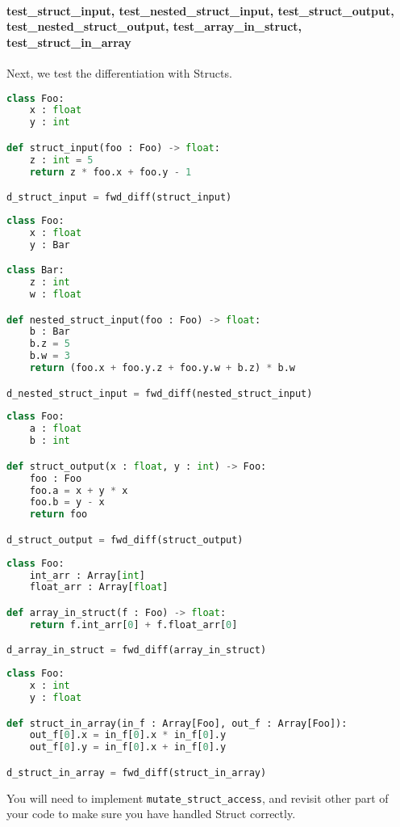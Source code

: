 \paragraph{test_struct_input, test_nested_struct_input, test_struct_output, test_nested_struct_output, test_array_in_struct, test_struct_in_array} Next, we test the differentiation with Structs.
\begin{lstlisting}[language=Python]
class Foo:
    x : float
    y : int

def struct_input(foo : Foo) -> float:
    z : int = 5
    return z * foo.x + foo.y - 1

d_struct_input = fwd_diff(struct_input)
\end{lstlisting}
\begin{lstlisting}[language=Python]
class Foo:
    x : float
    y : Bar

class Bar:
    z : int
    w : float

def nested_struct_input(foo : Foo) -> float:
    b : Bar
    b.z = 5
    b.w = 3
    return (foo.x + foo.y.z + foo.y.w + b.z) * b.w

d_nested_struct_input = fwd_diff(nested_struct_input)
\end{lstlisting}
\begin{lstlisting}[language=Python]
class Foo:
    a : float
    b : int

def struct_output(x : float, y : int) -> Foo:
    foo : Foo
    foo.a = x + y * x
    foo.b = y - x
    return foo

d_struct_output = fwd_diff(struct_output)
\end{lstlisting}
\begin{lstlisting}[language=Python]
class Foo:
    int_arr : Array[int]
    float_arr : Array[float]

def array_in_struct(f : Foo) -> float:
    return f.int_arr[0] + f.float_arr[0]

d_array_in_struct = fwd_diff(array_in_struct)
\end{lstlisting}
\begin{lstlisting}[language=Python]
class Foo:
    x : int
    y : float

def struct_in_array(in_f : Array[Foo], out_f : Array[Foo]):
    out_f[0].x = in_f[0].x * in_f[0].y
    out_f[0].y = in_f[0].x + in_f[0].y

d_struct_in_array = fwd_diff(struct_in_array)
\end{lstlisting}
You will need to implement \lstinline{mutate_struct_access}, and revisit other part of your code to make sure you have handled Struct correctly.

